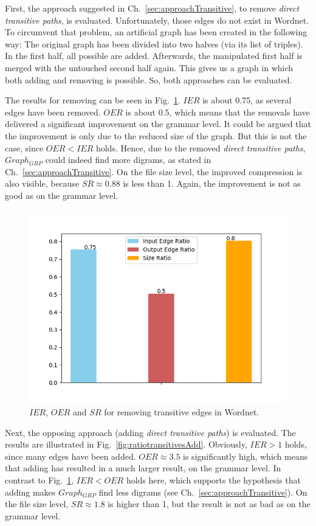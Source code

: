 First, the approach suggested in Ch.~\ref{sec:approachTransitive}, to remove \textit{direct transitive paths}, is evaluated. Unfortunately, those edges do not exist in Wordnet. To circumvent that problem, an artificial graph has been created in the following way:  The original graph has been divided into two halves (via its list of triples). In the first half, all possible \dtps are added. Afterwards, the manipulated first half is merged with the untouched second half again. This gives us a graph in which both adding and removing \dtps is possible. So, both approaches can be evaluated.

The results for removing \dtps can be seen in Fig.~\ref{fig:ratiotransitivesDelete}. $IER$ is about 0.75, as several edges have been removed. $OER$ is about 0.5, which means that the removals have delivered a significant improvement on the grammar level. It could be argued that the improvement is only due to the reduced size of the graph. But this is not the case, since $OER<IER$ holds. Hence, due to the removed \textit{direct transitive paths}, $Graph_{GRP}$ could indeed find more digrams, as stated in Ch.~\ref{sec:approachTransitive}. On the file size level, the improved compression is also visible, because $SR\approx0.88$ is less than 1. Again, the improvement is not as good as on the grammar level.

\begin{figure}
	\centering
	\includegraphics[width=0.8\linewidth]{figures/4_evaluation/ontology/ratioTransitivesDelete}
	\caption{$IER$, $OER$ and $SR$ for removing transitive edges in Wordnet.}
	\label{fig:ratiotransitivesDelete}
\end{figure}

Next, the opposing approach (adding \textit{direct transitive paths}) is evaluated. The results are illustrated in Fig.~\ref{fig:ratiotransitivesAdd}. Obviously, $ IER>1 $ holds, since many edges have been added. $OER\approx3.5$ is significantly high, which means that adding \dtps has resulted in a much larger result, on the grammar level. In contrast to Fig.~\ref{fig:ratiotransitivesDelete}, $IER<OER$ holds here, which supports the hypothesis that adding \dtps makes $Graph_{GRP}$ find less digrams (see Ch.~\ref{sec:approachTransitive}). On the file size level, $SR\approx1.8$ is higher than 1, but the result is not as bad as on the grammar level. 

